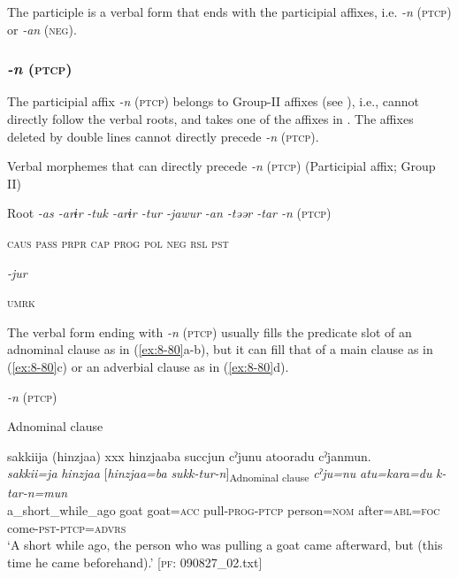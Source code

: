 The participle is a verbal form that ends with the participial affixes, i.e. \textit{-n} (\textsc{ptcp}) or \textit{-an} (\textsc{neg}).

\subsubsection{\textit{-n} (\textsc{ptcp})}

The participial affix \textit{-n} (\textsc{ptcp}) belongs to Group-II affixes (see ), i.e., cannot directly follow the verbal roots, and takes one of the affixes in . The affixes deleted by double lines cannot directly precede \textit{-n} (\textsc{ptcp}).

\ea\label{ex:8-79}
  Verbal morphemes that can directly precede \textit{-n} (\textsc{ptcp}) (Participial affix; Group II)

  Root  \textit{-as  -arɨr} %
\textit{-tuk  -arɨr  -tur  -jawur} %
\textit{-an  -təər  -tar  -n} (\textsc{ptcp})

    \textsc{caus}  \textsc{pass}  \textsc{prpr}  \textsc{cap}  \textsc{prog}  \textsc{pol}  \textsc{neg}  \textsc{rsl}  \textsc{pst}

          \textit{-jur}

          \textsc{umrk}
\z

The verbal form ending with \textit{-n} (\textsc{ptcp}) usually fills the predicate slot of an adnominal clause as in (\ref{ex:8-80}a-b), but it can fill that of a main clause as in (\ref{ex:8-80}c) or an adverbial clause as in (\ref{ex:8-80}d).

\ea\label{ex:8-80}
  \textit{-n} (\textsc{ptcp})

  Adnominal clause

\ea
{\TM}
\glll  sakkiija  (hinzjaa)  xxx  hinzjaaba  succjun    cˀjunu  atooradu  cˀjanmun.\\
\textit{sakkii=ja}  \textit{hinzjaa}    [\textit{hinzjaa=ba}  \textit{sukk-tur-n}]\textsubscript{Adnominal clause}  \textit{cˀju=nu}  \textit{atu=kara=du}  \textit{k-tar-n=mun}\\
a\_short\_while\_ago  goat    goat=\textsc{acc}  pull-\textsc{prog}-\textsc{ptcp}  person=\textsc{nom}  after=\textsc{abl}=\textsc{foc}  come-\textsc{pst}-\textsc{ptcp}=\textsc{advrs}\\
\glt ‘A short while ago, the person who was pulling a goat came afterward, but (this time he came beforehand).’ [\textsc{pf}: 090827\_02.txt]

